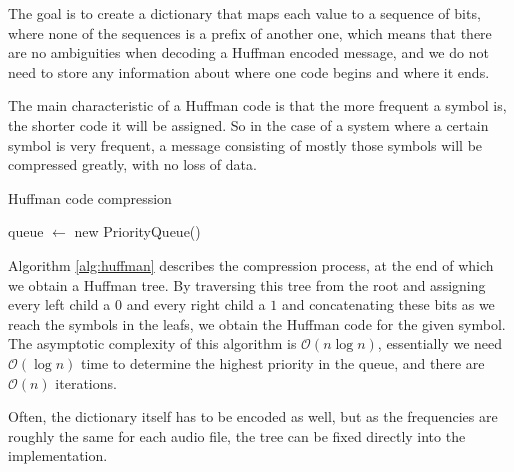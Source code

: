 The goal is to create a dictionary that maps each value to a sequence of bits, where none of the sequences is a prefix of another one, which means that there are no ambiguities when decoding a Huffman encoded message, and we do not need to store any information about where one code begins and where it ends.

The main characteristic of a Huffman code is that the more frequent a symbol is, the shorter code it will be assigned. So in the case of a system where a certain symbol is very frequent, a message consisting of mostly those symbols will be compressed greatly, with no loss of data.

\begin{algorithm}[h]
	\caption{Huffman code compression}
	\label{alg:huffman}
	queue $\leftarrow$ new PriorityQueue()\;
\end{algorithm}

Algorithm \ref{alg:huffman} describes the compression process, at the end of which we obtain a Huffman tree. By traversing this tree from the root and assigning every left child a $0$ and every right child a $1$ and concatenating these bits as we reach the symbols in the leafs, we obtain the Huffman code for the given symbol. The asymptotic complexity of this algorithm is $\mathcal{O}(n \log n)$, essentially we need $\mathcal{O}(\log n)$ time to determine the highest priority in the queue, and there are $\mathcal{O}(n)$ iterations.

Often, the dictionary itself has to be encoded as well, but as the frequencies are roughly the same for each audio file, the tree can be fixed directly into the implementation.

